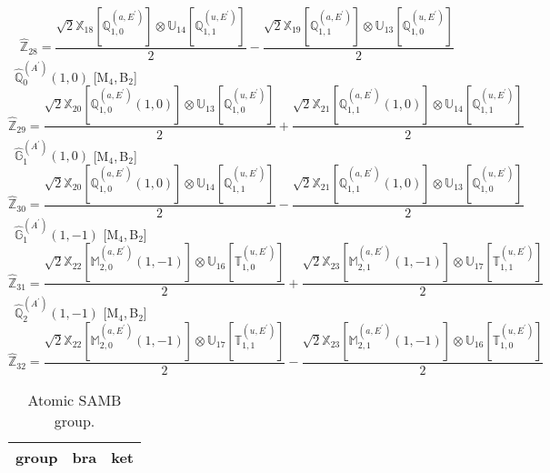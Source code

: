 \documentclass[fleqn,10pt,landscape]{article}
\begin{document}
\begin{itemize}
\begin{dmath*}
\hat{\mathbb{Z}}_{28}=\frac{\sqrt{2} \mathbb{X}_{18}[\mathbb{Q}_{1,0}^{(a,E^{\prime})}] \otimes\mathbb{U}_{14}[\mathbb{Q}_{1,1}^{(u,E^{\prime})}]}{2} - \frac{\sqrt{2} \mathbb{X}_{19}[\mathbb{Q}_{1,1}^{(a,E^{\prime})}] \otimes\mathbb{U}_{13}[\mathbb{Q}_{1,0}^{(u,E^{\prime})}]}{2}
\end{dmath*}
\vspace{4mm}
\noindent {} $\,\,\,\hat{\mathbb{Q}}_{0}^{(A^{\prime})}(1,0)$ [M$_{4}$,\,B$_{2}$]
\begin{dmath*}
\hat{\mathbb{Z}}_{29}=\frac{\sqrt{2} \mathbb{X}_{20}[\mathbb{Q}_{1,0}^{(a,E^{\prime})}(1,0)] \otimes\mathbb{U}_{13}[\mathbb{Q}_{1,0}^{(u,E^{\prime})}]}{2} + \frac{\sqrt{2} \mathbb{X}_{21}[\mathbb{Q}_{1,1}^{(a,E^{\prime})}(1,0)] \otimes\mathbb{U}_{14}[\mathbb{Q}_{1,1}^{(u,E^{\prime})}]}{2}
\end{dmath*}
\vspace{4mm}
\noindent {} $\,\,\,\hat{\mathbb{G}}_{1}^{(A^{\prime})}(1,0)$ [M$_{4}$,\,B$_{2}$]
\begin{dmath*}
\hat{\mathbb{Z}}_{30}=\frac{\sqrt{2} \mathbb{X}_{20}[\mathbb{Q}_{1,0}^{(a,E^{\prime})}(1,0)] \otimes\mathbb{U}_{14}[\mathbb{Q}_{1,1}^{(u,E^{\prime})}]}{2} - \frac{\sqrt{2} \mathbb{X}_{21}[\mathbb{Q}_{1,1}^{(a,E^{\prime})}(1,0)] \otimes\mathbb{U}_{13}[\mathbb{Q}_{1,0}^{(u,E^{\prime})}]}{2}
\end{dmath*}
\vspace{4mm}
\noindent {} $\,\,\,\hat{\mathbb{G}}_{1}^{(A^{\prime})}(1,-1)$ [M$_{4}$,\,B$_{2}$]
\begin{dmath*}
\hat{\mathbb{Z}}_{31}=\frac{\sqrt{2} \mathbb{X}_{22}[\mathbb{M}_{2,0}^{(a,E^{\prime})}(1,-1)] \otimes\mathbb{U}_{16}[\mathbb{T}_{1,0}^{(u,E^{\prime})}]}{2} + \frac{\sqrt{2} \mathbb{X}_{23}[\mathbb{M}_{2,1}^{(a,E^{\prime})}(1,-1)] \otimes\mathbb{U}_{17}[\mathbb{T}_{1,1}^{(u,E^{\prime})}]}{2}
\end{dmath*}
\vspace{4mm}
\noindent {} $\,\,\,\hat{\mathbb{Q}}_{2}^{(A^{\prime})}(1,-1)$ [M$_{4}$,\,B$_{2}$]
\begin{dmath*}
\hat{\mathbb{Z}}_{32}=\frac{\sqrt{2} \mathbb{X}_{22}[\mathbb{M}_{2,0}^{(a,E^{\prime})}(1,-1)] \otimes\mathbb{U}_{17}[\mathbb{T}_{1,1}^{(u,E^{\prime})}]}{2} - \frac{\sqrt{2} \mathbb{X}_{23}[\mathbb{M}_{2,1}^{(a,E^{\prime})}(1,-1)] \otimes\mathbb{U}_{16}[\mathbb{T}_{1,0}^{(u,E^{\prime})}]}{2}
\end{dmath*}
\begin{center}
\renewcommand{\arraystretch}{1.3}
\begin{longtable}{c|c|c}
\caption{Atomic SAMB group.}
 \\
 \hline \hline
group & bra & ket \\ \hline \endfirsthead


\end{longtable}
\end{center}
\end{itemize}
\end{document}
